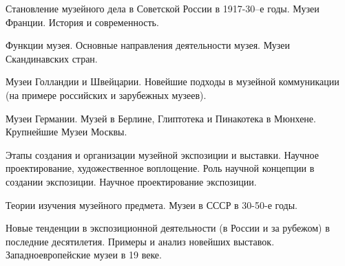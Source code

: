 \documentclass[
	14pt,
	a4paper,
	]
	{scrartcl}
\begin{document}
\vfill

\newpage


\shapk
{}
\setcounter{zad}{0}

\vfill
\z Становление музейного дела в Советской России в 1917-30–е годы.
 \vfill
\z Музеи Франции. История и современность.
 \vfill

\vfill

\newpage


\shapk
{}
\setcounter{zad}{0}

\vfill
\z Функции музея. Основные направления деятельности музея.
 \vfill
\z Музеи Скандинавских стран.
 \vfill

\vfill

\newpage


\shapk
{}
\setcounter{zad}{0}

\vfill
\z Музеи Голландии и Швейцарии.
 \vfill
\z Новейшие подходы в музейной коммуникации (на примере российских и зарубежных музеев).
 \vfill

\vfill

\newpage


\shapk
{}
\setcounter{zad}{0}

\vfill
\z Музеи Германии. Музей в Берлине, Глиптотека и Пинакотека в Мюнхене.
 \vfill
\z Крупнейшие Музеи Москвы.
 \vfill

\vfill

\newpage


\shapk
{}
\setcounter{zad}{0}

\vfill
\z Этапы создания и организации музейной экспозиции и выставки. Научное проектирование, художественное воплощение.
 \vfill
\z Роль научной концепции в создании экспозиции. Научное проектирование экспозиции.
 \vfill

\vfill

\newpage


\shapk
{}
\setcounter{zad}{0}

\vfill
\z Теории изучения музейного предмета.
 \vfill
\z Музеи в СССР в 30-50-е годы.
 \vfill

\vfill

\newpage


\shapk
{}
\setcounter{zad}{0}

\vfill
\z Новые тенденции в экспозиционной деятельности (в России и за рубежом) в последние десятилетия. Примеры и анализ новейших выставок.
 \vfill
\z Западноевропейские музеи в 19 веке.
 \vfill
\end{document}
